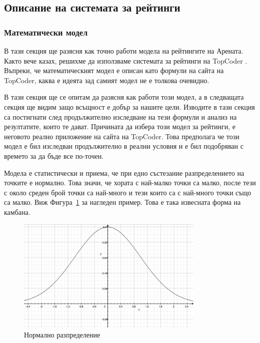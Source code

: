 \documentclass[a4paper,12pt]{article}
\begin{document}
  \subsection{Описание на системата за рейтинги}
  
  \subsubsection{Математически модел}
  В тази секция ще разясня как точно работи модела на рейтингите на Арената. Както вече казах, решихме да използваме системата за рейтинги на TopCoder \cite{topcoder_ratings}. Въпреки, че математическият модел е описан като формули на сайта на TopCoder, каква е идеята зад самият модел не е толкова очевидно.

  В тази секция ще се опитам да разясня как работи този модел, а в следващата секция ще видим защо всъщност е добър за нашите цели. Изводите в тази секция са постигнати след продължително изследване на тези формули и анализ на резултатите, които те дават. Причината да избера този модел за рейтинги, е неговото реално приложение на сайта на TopCoder. Това предполага че този модел е бил изследван продължително в реални условия и е бил подобряван с времето за да бъде все по-точен.
  
  Модела е статистически и приема, че при едно състезание разпределението на точките е нормално. Това значи, че хората с най-малко точки са малко, после тези с около среден брой точки са най-много и тези които са с най-много точки също са малко. Виж Фигура~\ref{normal_distribution} за нагледен пример. Това е така извесната форма на камбана.
  
  \begin{figure}
    \begin{center}
      \includegraphics[width=0.8\textwidth]{images/normal_distribution.png}
    \end{center}
    \caption{Нормално разпределение}
    \label{normal_distribution}
  \end{figure}
  
\end{document}
